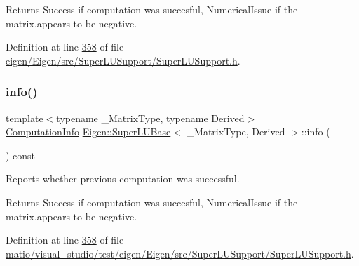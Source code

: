 \begin{DoxyReturn}{Returns}
{\ttfamily Success} if computation was succesful, {\ttfamily Numerical\+Issue} if the matrix.\+appears to be negative. 
\end{DoxyReturn}


Definition at line \hyperlink{eigen_2_eigen_2src_2_super_l_u_support_2_super_l_u_support_8h_source_l00358}{358} of file \hyperlink{eigen_2_eigen_2src_2_super_l_u_support_2_super_l_u_support_8h_source}{eigen/\+Eigen/src/\+Super\+L\+U\+Support/\+Super\+L\+U\+Support.\+h}.

\mbox{\label{class_eigen_1_1_super_l_u_base_aa67da5c8c24110931c949c5896c5ec03}} 
\subsubsection{\texorpdfstring{info()}{info()}\hspace{0.1cm}{\footnotesize\ttfamily [2/2]}}
{\footnotesize\ttfamily template$<$typename \+\_\+\+Matrix\+Type, typename Derived$>$ \\
\hyperlink{group__enums_ga85fad7b87587764e5cf6b513a9e0ee5e}{Computation\+Info} \hyperlink{class_eigen_1_1_super_l_u_base}{Eigen\+::\+Super\+L\+U\+Base}$<$ \+\_\+\+Matrix\+Type, Derived $>$\+::info (\begin{DoxyParamCaption}{ }\end{DoxyParamCaption}) const\hspace{0.3cm}{\ttfamily [inline]}}



Reports whether previous computation was successful. 

\begin{DoxyReturn}{Returns}
{\ttfamily Success} if computation was succesful, {\ttfamily Numerical\+Issue} if the matrix.\+appears to be negative. 
\end{DoxyReturn}


Definition at line \hyperlink{matio_2visual__studio_2test_2eigen_2_eigen_2src_2_super_l_u_support_2_super_l_u_support_8h_source_l00358}{358} of file \hyperlink{matio_2visual__studio_2test_2eigen_2_eigen_2src_2_super_l_u_support_2_super_l_u_support_8h_source}{matio/visual\+\_\+studio/test/eigen/\+Eigen/src/\+Super\+L\+U\+Support/\+Super\+L\+U\+Support.\+h}.

